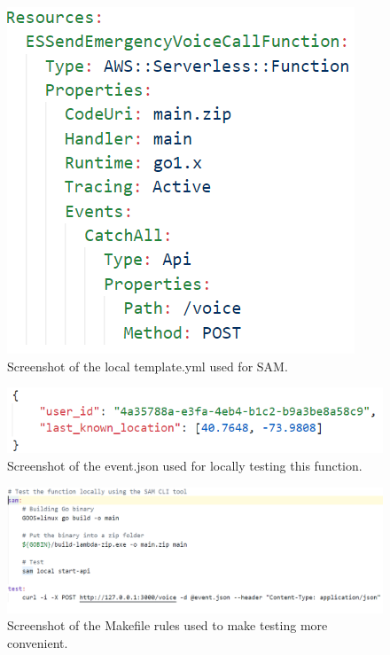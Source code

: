 \documentclass[10pt, a4paper]{article}
\begin{document}
\begin{figure}[H]
  \includegraphics[scale=.7]{code-screenshots/local-template.png}
  \caption{Screenshot of the local template.yml used for SAM.}
\end{figure}
\begin{figure}[H]
  \includegraphics[scale=.7]{code-screenshots/event.PNG}
  \caption{Screenshot of the event.json used for locally testing this function.}
\end{figure}
\begin{figure}[H]
  \includegraphics[scale=.7]{code-screenshots/makefile.PNG}
  \caption{Screenshot of the Makefile rules used to make testing more convenient.}
\end{figure}
\end{document}
